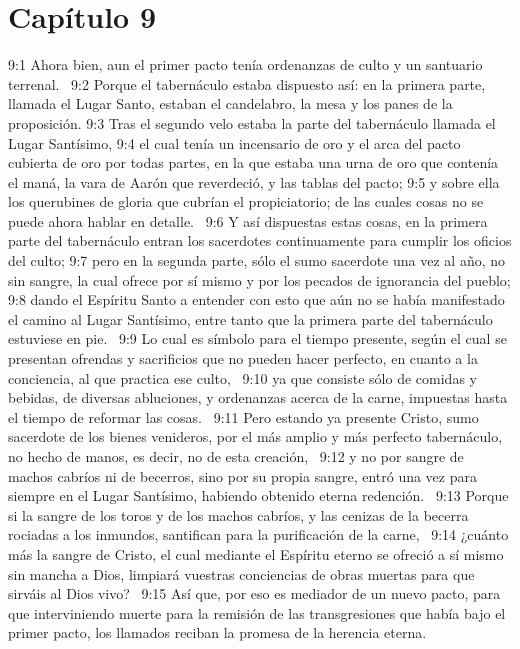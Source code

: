 \section*{Capítulo 9 }

9:1 Ahora bien, aun el primer pacto tenía ordenanzas de culto y un santuario terrenal.  
9:2 Porque el tabernáculo estaba dispuesto así: en la primera parte, llamada el Lugar Santo, estaban el candelabro, la mesa y los panes de la proposición. 
9:3 Tras el segundo velo estaba la parte del tabernáculo llamada el Lugar Santísimo, 
9:4 el cual tenía un incensario de oro y el arca del pacto cubierta de oro por todas partes, en la que estaba una urna de oro que contenía el maná, la vara de Aarón que reverdeció, y las tablas del pacto; 
9:5 y sobre ella los querubines de gloria que cubrían el propiciatorio; de las cuales cosas no se puede ahora hablar en detalle.  
9:6 Y así dispuestas estas cosas, en la primera parte del tabernáculo entran los sacerdotes continuamente para cumplir los oficios del culto; 
9:7 pero en la segunda parte, sólo el sumo sacerdote una vez al año, no sin sangre, la cual ofrece por sí mismo y por los pecados de ignorancia del pueblo; 
9:8 dando el Espíritu Santo a entender con esto que aún no se había manifestado el camino al Lugar Santísimo, entre tanto que la primera parte del tabernáculo estuviese en pie.  
9:9 Lo cual es símbolo para el tiempo presente, según el cual se presentan ofrendas y sacrificios que no pueden hacer perfecto, en cuanto a la conciencia, al que practica ese culto,  
9:10 ya que consiste sólo de comidas y bebidas, de diversas abluciones, y ordenanzas acerca de la carne, impuestas hasta el tiempo de reformar las cosas.  
9:11 Pero estando ya presente Cristo, sumo sacerdote de los bienes venideros, por el más amplio y más perfecto tabernáculo, no hecho de manos, es decir, no de esta creación,  
9:12 y no por sangre de machos cabríos ni de becerros, sino por su propia sangre, entró una vez para siempre en el Lugar Santísimo, habiendo obtenido eterna redención.  
9:13 Porque si la sangre de los toros y de los machos cabríos, y las cenizas de la becerra rociadas a los inmundos, santifican para la purificación de la carne,  
9:14 ¿cuánto más la sangre de Cristo, el cual mediante el Espíritu eterno se ofreció a sí mismo sin mancha a Dios, limpiará vuestras conciencias de obras muertas para que sirváis al Dios vivo?  
9:15 Así que, por eso es mediador de un nuevo pacto, para que interviniendo muerte para la remisión de las transgresiones que había bajo el primer pacto, los llamados reciban la promesa de la herencia eterna.  
